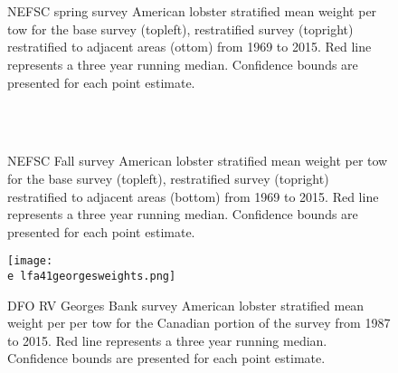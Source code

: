 \documentclass[11pt]{article}
\newcommand{\e}{/backup/bio_data/bio.lobster/figures/} %
\begin{document}
\begin{figure}
\centering
{}
\\
\\

\caption{NEFSC spring survey American lobster stratified mean weight per tow for the base survey (topleft), restratified survey (topright) restratified to adjacent areas (ottom) from 1969 to 2015. Red line represents a three year running median. Confidence bounds are presented for each point estimate. }
\end{figure}
\clearpage



\begin{figure}
\centering
{}
\\
\\

\caption{NEFSC Fall survey American lobster stratified mean weight per tow for the base survey (topleft), restratified survey (topright) restratified to adjacent areas (bottom) from 1969 to 2015. Red line represents a three year running median. Confidence bounds are presented for each point estimate. }
\end{figure}
\clearpage


\begin{figure}

    \texttt{[image: \\e lfa41georgesweights.png]}
    \caption{DFO RV Georges Bank survey American lobster stratified mean weight per per tow for the Canadian portion of the survey from 1987 to 2015. Red line represents a three year running median. Confidence bounds are presented for each point estimate.}

\end{figure}
\end{document}
